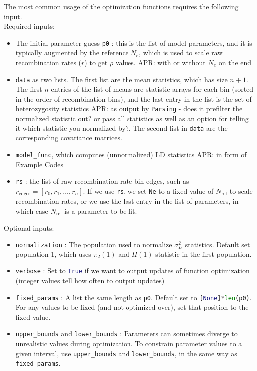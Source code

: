 \documentclass[10pt]{article}
\makeatletter
\newcommand{\comment}[1]{{\color{blue}APR: #1}}
\newcommand{\py}[1]{\lstinline[breaklines=true,language=Python, showstringspaces=False]@#1@}
\makeatother
\begin{document}
The most common usage of the optimization functions requires the following input.\\
Required inputs:
\begin{itemize}
\item The initial parameter guess \py{p0} : this is the list of model parameters, and it is typically augmented by the reference $N_e$, which is used to scale raw recombination rates ($r$) to get $\rho$ values. \comment{with or without $N_e$ on the end}
\item \py{data} as two lists. The first list are the mean statistics, which has size $n+1$. The first $n$ entries of the list of means are statistic arrays for each bin (sorted in the order of recombination bins), and the last entry in the list is the set of heterozygosity statistics \comment{as output by \py{Parsing} - does it prefilter the normalized statistic out? or pass all statistics as well as an option for telling it which statistic you normalized by?}. The second list in \py{data} are the corresponding covariance matrices.
\item \py{model_func}, which computes (unnormalized) LD statistics \comment{in form of Example Codes}
\item \py{rs} : the list of raw recombination rate bin edges, such as $r_\text{edges} = [r_0, r_1, \ldots, r_n]$. If we use \py{rs}, we set \py{Ne} to a fixed value of $N_\text{ref}$ to scale recombination rates, or we use the last entry in the list of parameters, in which case $N_\text{ref}$ is a parameter to be fit.
\end{itemize}
Optional inputs:
\begin{itemize}
\item \py{normalization} : The population used to normalize $\sigma_D^2$ statistics. Default set population 1, which uses $\pi_2(1)$ and $H(1)$ statistic in the first population.
\item \py{verbose} : Set to \py{True} if we want to output updates of function optimization (integer values tell how often to output updates)
\item \py{fixed_params} : A list the same length as \py{p0}. Default set to \py{[None]*len(p0)}. For any values to be fixed (and not optimized over), set that position to the fixed value.
\item \py{upper_bounds} and \py{lower_bounds} : Parameters can sometimes diverge to unrealistic values during optimization. To constrain parameter values to a given interval, use \py{upper_bounds} and \py{lower_bounds}, in the same way as \py{fixed_params}.
\end{itemize}
\end{document}
